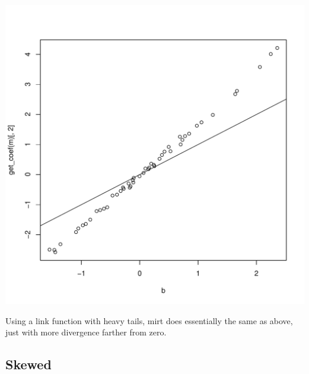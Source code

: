 \documentclass{article}\usepackage[]{graphicx}\usepackage[]{color}
\makeatletter
\def\maxwidth{ %
  \ifdim\Gin@nat@width>\linewidth
    \linewidth
  \else
    \Gin@nat@width
  \fi
}
\newenvironment{knitrout}{}{} %
\makeatother
\begin{document}
\begin{knitrout}
\color{fgcolor}
\includegraphics[width=\maxwidth]{figure/unnamed-chunk-7-1} 

\end{knitrout}

Using a link function with heavy tails, mirt does essentially the same as above, just with more divergence farther from zero.

\subsection{Skewed}
\end{document}
